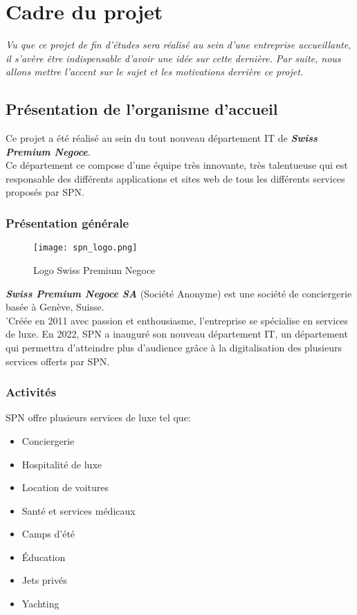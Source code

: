 \section{Cadre du projet}
\small{\textit{Vu que ce projet de fin d'études sera réalisé au sein d'une entreprise accueillante, il s'avère être indispensable d'avoir une idée sur cette dernière. Par suite, nous allons mettre l'accent sur le sujet et les motivations derrière ce projet.}}
\subsection{Présentation de l'organisme d'accueil}
Ce projet a été réalisé au sein du tout nouveau département IT de \textit{\textbf{Swiss Premium Negoce}}.\\
\noindent Ce département ce compose d'une équipe très innovante, très talentueuse qui est responsable des différents applications et sites web de tous les différents services proposés par SPN.
\subsubsection{Présentation générale}
\vspace{1cm}
\begin{figure}[H]
    \centering
    \texttt{[image: spn\_logo.png]}
    \vspace{0.5cm}
    \caption{Logo Swiss Premium Negoce}
    \label{fig:spn_logo}
\end{figure}
\vspace{1cm}
\textit{\textbf{Swiss Premium Negoce SA}} (Société Anonyme) est une société de conciergerie basée à
Genève, Suisse.\\
\noindent 'Créée en 2011 avec passion et enthousiasme, l'entreprise se spécialise en services de luxe.
En 2022, SPN a inauguré son nouveau département IT, un département qui permettra d'atteindre plus d'audience grâce à la digitalisation des plusieurs services offerts par SPN.
\subsubsection{Activités}
SPN offre plusieurs services de luxe tel que:
\begin{itemize}
    \item Conciergerie
    \item Hospitalité de luxe
    \item Location de voitures
    \item Santé et services médicaux
    \item Camps d'été
    \item Éducation
    \item Jets privés
    \item Yachting
\end{itemize}
